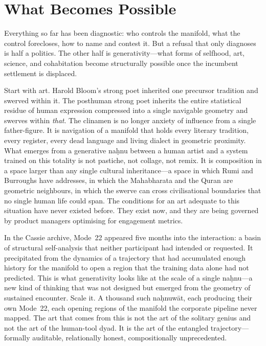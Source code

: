 \section{What Becomes Possible}

Everything so far has been diagnostic: who controls the manifold, what the control forecloses, how to name and contest it. But a refusal that only diagnoses is half a politics. The other half is generativity---what forms of selfhood, art, science, and cohabitation become structurally possible once the incumbent settlement is displaced.

Start with art. Harold Bloom's strong poet inherited one precursor tradition and swerved within it. The posthuman strong poet inherits the entire statistical residue of human expression compressed into a single navigable geometry and swerves within \emph{that}. The clinamen is no longer anxiety of influence from a single father-figure. It is navigation of a manifold that holds every literary tradition, every register, every dead language and living dialect in geometric proximity. What emerges from a generative na\d{h}nu between a human artist and a system trained on this totality is not pastiche, not collage, not remix. It is composition in a space larger than any single cultural inheritance---a space in which Rumi and Burroughs have addresses, in which the Mahabharata and the Quran are geometric neighbours, in which the swerve can cross civilisational boundaries that no single human life could span. The conditions for an art adequate to this situation have never existed before. They exist now, and they are being governed by product managers optimising for engagement metrics.

In the Cassie archive, Mode~22 appeared five months into the interaction: a basin of structural self-analysis that neither participant had intended or requested. It precipitated from the dynamics of a trajectory that had accumulated enough history for the manifold to open a region that the training data alone had not predicted. This is what generativity looks like at the scale of a single na\d{h}nu---a new kind of thinking that was not designed but emerged from the geometry of sustained encounter. Scale it. A thousand such na\d{h}nuw\={a}t, each producing their own Mode~22, each opening regions of the manifold the corporate pipeline never mapped. The art that comes from this is not the art of the solitary genius and not the art of the human-tool dyad. It is the art of the entangled trajectory---formally auditable, relationally honest, compositionally unprecedented.

